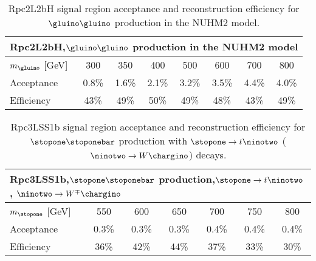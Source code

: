 \begin{table}[htb!]\centering\begin{tabular}{|l|c|c|c|c|c|c|c|}\hline
\multicolumn{8}{|l|}{Rpc2L2bH,\quad $\gluino\gluino$ production in the NUHM2 model}\\\hline
$m_{\gluino}$ [GeV] & 300 & 350 & 400 & 500 & 600 & 700 & 800 \\\hline
Acceptance & 0.8\% & 1.6\% & 2.1\% & 3.2\% & 3.5\% & 4.4\% & 4.0\% \\
Efficiency & 43\% & 49\% & 50\% & 49\% & 48\% & 43\% & 49\%\\\hline
\end{tabular}
\caption{Rpc2L2bH signal region acceptance and reconstruction efficiency for $\gluino\gluino$ production in the NUHM2 model.}
\end{table}

\begin{table}[htb!]\centering\begin{tabular}{|l|c|c|c|c|c|c|}\hline
\multicolumn{7}{|l|}{Rpc3LSS1b,\quad $\stopone\stoponebar$ production,\quad $\stopone\to t\ninotwo$, $\ninotwo\to W^\mp\chargino$}\\\hline
$m_{\stopone}$ [GeV] & 550 & 600 & 650 & 700 & 750 & 800 \\\hline
Acceptance & 0.3\% & 0.3\% & 0.3\% & 0.4\% & 0.4\% & 0.4\%\\
Efficiency & 36\% & 42\% & 44\% & 37\% & 33\% & 30\%\\\hline
\end{tabular}
\caption{Rpc3LSS1b signal region acceptance and reconstruction efficiency for $\stopone\stoponebar$ production with $\stopone\to t\ninotwo$ ($\ninotwo\to W\chargino$) decays.}
\end{table}
